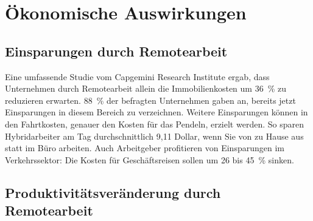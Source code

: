 \documentclass[runningheads]{llncs}
\begin{document}





\section{Ökonomische Auswirkungen}


\subsection{Einsparungen durch Remotearbeit}

Eine umfassende Studie vom Capgemini Research Institute ergab, dass Unternehmen durch Remotearbeit allein die Immobilienkosten um 36~\% zu reduzieren erwarten.
88~\% der befragten Unternehmen gaben an, bereits jetzt Einsparungen in diesem Bereich zu verzeichnen.
Weitere Einsparungen können in den Fahrtkosten, genauer den Kosten für das Pendeln, erzielt werden.
So sparen Hybridarbeiter am Tag durchschnittlich 9,11 Dollar, wenn Sie von zu Hause aus statt im Büro arbeiten.
Auch Arbeitgeber profitieren von Einsparungen im Verkehrssektor:
Die Kosten für Geschäftsreisen sollen um 26 bis 45~\% sinken. \cite{capgemini_research_institute_future_2020, owl_labs_state_2022}

\subsection{Produktivitätsveränderung durch Remotearbeit}
\end{document}

